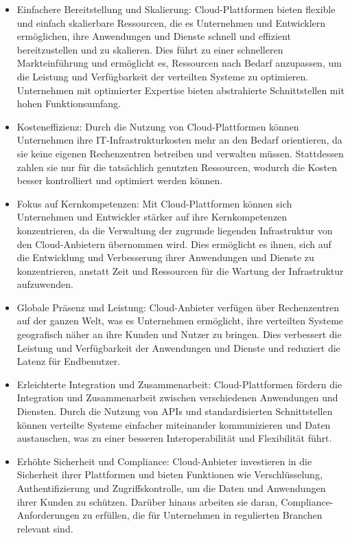 \documentclass[../vs-script-first-v01.tex]{subfiles}
\begin{document}
\begin{itemize}
\item Einfachere Bereitstellung und Skalierung: Cloud-Plattformen bieten flexible und einfach skalierbare Ressourcen, die es Unternehmen und Entwicklern ermöglichen, ihre Anwendungen und Dienste schnell und effizient bereitzustellen und zu skalieren. Dies führt zu einer schnelleren Markteinführung und ermöglicht es, Ressourcen nach Bedarf anzupassen, um die Leistung und Verfügbarkeit der verteilten Systeme zu optimieren. Unternehmen mit optimierter Expertise bieten abstrahierte Schnittstellen mit hohen Funktionsumfang. 
\item Kosteneffizienz: Durch die Nutzung von Cloud-Plattformen können Unternehmen ihre IT-Infrastrukturkosten mehr an den Bedarf orientieren, da sie keine eigenen Rechenzentren betreiben und verwalten müssen. Stattdessen zahlen sie nur für die tatsächlich genutzten Ressourcen, wodurch die Kosten besser kontrolliert und optimiert werden können.
\item Fokus auf Kernkompetenzen: Mit Cloud-Plattformen können sich Unternehmen und Entwickler stärker auf ihre Kernkompetenzen konzentrieren, da die Verwaltung der zugrunde liegenden Infrastruktur von den Cloud-Anbietern übernommen wird. Dies ermöglicht es ihnen, sich auf die Entwicklung und Verbesserung ihrer Anwendungen und Dienste zu konzentrieren, anstatt Zeit und Ressourcen für die Wartung der Infrastruktur aufzuwenden.
\item Globale Präsenz und Leistung: Cloud-Anbieter verfügen über Rechenzentren auf der ganzen Welt, was es Unternehmen ermöglicht, ihre verteilten Systeme geografisch näher an ihre Kunden und Nutzer zu bringen. Dies verbessert die Leistung und Verfügbarkeit der Anwendungen und Dienste und reduziert die Latenz für Endbenutzer.
\item Erleichterte Integration und Zusammenarbeit: Cloud-Plattformen fördern die Integration und Zusammenarbeit zwischen verschiedenen Anwendungen und Diensten. Durch die Nutzung von APIs und standardisierten Schnittstellen können verteilte Systeme einfacher miteinander kommunizieren und Daten austauschen, was zu einer besseren Interoperabilität und Flexibilität führt.
\item Erhöhte Sicherheit und Compliance: Cloud-Anbieter investieren in die Sicherheit ihrer Plattformen und bieten Funktionen wie Verschlüsselung, Authentifizierung und Zugriffskontrolle, um die Daten und Anwendungen ihrer Kunden zu schützen. Darüber hinaus arbeiten sie daran, Compliance-Anforderungen zu erfüllen, die für Unternehmen in regulierten Branchen relevant sind.
\end{itemize}
\end{document}
